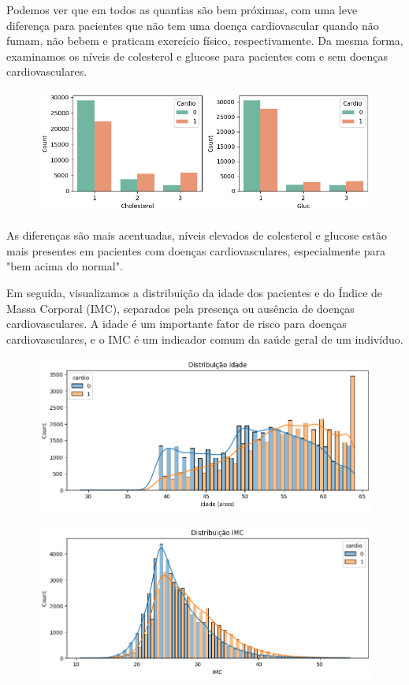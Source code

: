 \documentclass[article,11pt,a4paper,brazil]{abntex2}
\begin{document}
	Podemos ver que em todos as quantias são bem próximas, com uma leve diferença para pacientes que não tem uma doença cardiovascular quando não fumam, não bebem e praticam exercício físico, respectivamente. Da mesma forma, examinamos os níveis de colesterol e glucose para pacientes com e sem doenças cardiovasculares.	
	\begin{figure}[H]
		\centering
		\includegraphics[width=0.6\linewidth]{Images/categorical2.png}
	\end{figure}	
	As diferenças são mais acentuadas, níveis elevados de colesterol e glucose estão mais presentes em pacientes com doenças cardiovasculares, especialmente para "bem acima do normal".
	
	 Em seguida, visualizamos a distribuição da idade dos pacientes e do Índice de Massa Corporal (IMC), separados pela presença ou ausência de doenças cardiovasculares. A idade é um importante fator de risco para doenças cardiovasculares, e o IMC é um indicador comum da saúde geral de um indivíduo.
	
	\begin{figure}[H]
		\centering
		\includegraphics[width=0.8\linewidth]{Images/dist_idade.png}
	\end{figure}
	\begin{figure}[H]
		\centering
		\includegraphics[width=0.8\linewidth]{Images/dist_imc.png}
	\end{figure}
	
\end{document}
